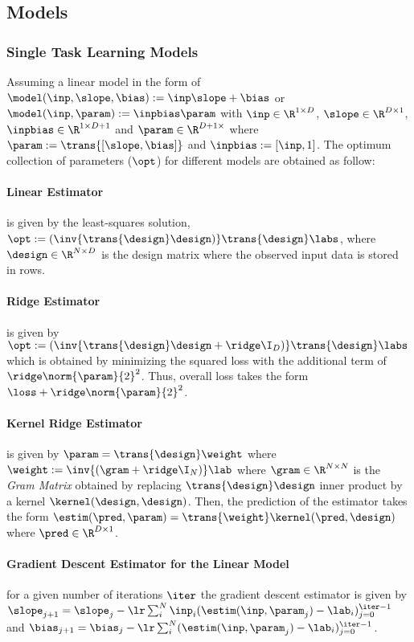 \subsection{Models} 

\subsubsection{Single Task Learning Models}

Assuming a linear model in the form of $\model(\inp,\slope,\bias):=\inp\slope+\bias$ or $\model(\inp, \param):=\inpbias\param$ with $\inp\in\R^{1\times D}$, $\slope\in\R^{D\times 1}$, $\inpbias\in\R^{1\times D+1}$ and $\param\in\R^{D+1\times}$ where $\param:=\trans{[\slope, \bias]}$ and $\inpbias:=[\inp, 1]$. The optimum collection of parameters ($\opt$) for different models are obtained as follow:

\paragraph{Linear Estimator} is given by the least-squares solution, $\opt:=(\inv{\trans{\design}\design)}\trans{\design}\labs$, where $\design\in\R^{N\times D}$ is the design matrix where the observed input data is stored in rows.

\paragraph{Ridge Estimator} is given by $\opt:=(\inv{\trans{\design}\design+\ridge \I_{D})}\trans{\design}\labs$ which is obtained by minimizing the squared loss with the additional term of $\ridge\norm{\param}{2}^2$. Thus, overall loss takes the form $\loss+\ridge\norm{\param}{2}^2$.


\paragraph{Kernel Ridge Estimator} is given by $\param = \trans{\design}\weight$ where $\weight:=\inv{(\gram+\ridge\I_{N})}\lab$ where $\gram\in\R^{N\times N}$ is the  \textit{Gram Matrix} obtained by replacing $\trans{\design}\design$ inner product by a kernel $\kernel(\design, \design)$. Then, the prediction of the estimator takes the form $\estim(\pred,\param)=\trans{\weight}\kernel(\pred,\design)$ where $\pred\in\R^{D\times 1}$.

\paragraph{Gradient Descent Estimator for the Linear Model} for a given number of iterations $\iter$ the gradient descent estimator is given by $\slope_{j+1}=\slope_{j} - \lr\sum_i^{N}\inp_i(\estim(\inp,\param_j)-\lab_i)_{j=0}^{\iter-1}$ and $\bias_{j+1}=\bias_{j} - \lr\sum_i^{N}(\estim(\inp,\param_j)-\lab_i)_{j=0}^{\iter-1}$.


